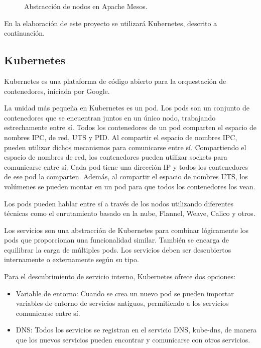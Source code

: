 \begin{figure}[H]
\caption{Abstracción de nodos en Apache Mesos.\label{fig:figure_placement_example}}
\end{figure}

En la elaboración de este proyecto se utilizará Kubernetes, descrito a continuación.	

\subsection{Kubernetes}

Kubernetes es una plataforma de código abierto para la orquestación de contenedores, iniciada por Google.

La unidad más pequeña en Kubernetes es un pod. Los pods son un conjunto de contenedores que se encuentran juntos en un único nodo, trabajando estrechamente entre sí. Todos los contenedores de un pod comparten el espacio de nombres IPC, de red, UTS y PID. Al compartir el espacio de nombres IPC, pueden utilizar dichos mecanismos para comunicarse entre sí. Compartiendo el espacio de nombres de red, los contenedores pueden utilizar sockets para comunicarse entre sí. Cada pod tiene una dirección IP y todos los contenedores de ese pod la comparten. Además, al compartir el espacio de nombres UTS, los volúmenes se pueden montar en un pod para que todos los contenedores los vean.

Los pods pueden hablar entre sí a través de los nodos utilizando diferentes técnicas como el enrutamiento basado en la nube, Flannel, Weave, Calico y otros.

Los servicios son una abstracción de Kubernetes para combinar lógicamente los pods que proporcionan una funcionalidad similar. También se encarga de equilibrar la carga de múltiples pods. Los servicios deben ser descubiertos internamente o externamente según su tipo.

Para el descubrimiento de servicio interno, Kubernetes ofrece dos opciones:
\begin{itemize}
\item Variable de entorno: Cuando se crea un nuevo pod se pueden importar variables de entorno de servicios antiguos, permitiendo a los servicios comunicarse entre sí.
\item DNS: Todos los servicios se registran en el servicio DNS, kube-dns, de manera que los nuevos servicios pueden encontrar y comunicarse con otros servicios.
\end{itemize}


